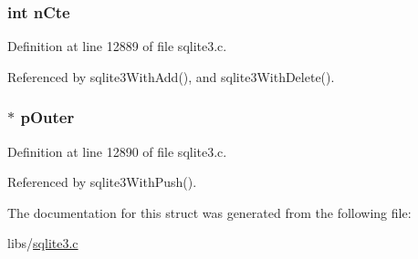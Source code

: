 \subsubsection[{n\+Cte}]{\setlength{\rightskip}{0pt plus 5cm}int n\+Cte}\label{struct_with_aefe30147a9d64ed7677c1129cf205eea}


Definition at line 12889 of file sqlite3.\+c.



Referenced by sqlite3\+With\+Add(), and sqlite3\+With\+Delete().

\hypertarget{struct_with_a30c5baa75a7b429881952d15110aa4a6}{}
\subsubsection[{p\+Outer}]{$\ast$ p\+Outer}\label{struct_with_a30c5baa75a7b429881952d15110aa4a6}


Definition at line 12890 of file sqlite3.\+c.



Referenced by sqlite3\+With\+Push().



The documentation for this struct was generated from the following file\+:\begin{DoxyCompactItemize}
\item 
libs/\hyperlink{sqlite3_8c}{sqlite3.\+c}\end{DoxyCompactItemize}
